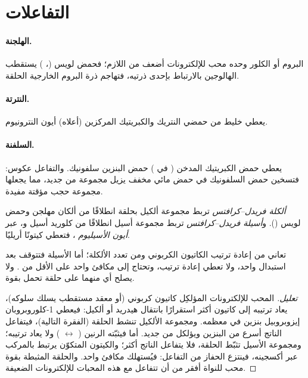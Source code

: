 \section{التفاعلات}

\paragraph{الهلجنة.} البروم أو الكلور وحده محب للإلكترونات أضعف من اللازم؛ فحمض لويس
(، ) يستقطب الهالوجين بالارتباط بإحدى ذرتيه، فتهاجم ذرة
البروم الخارجية الحلقة.

\paragraph{النترتة.} يعطي خليط من حمضي النتريك والكبريتيك المركزين (أعلاه)
أيون النترونيوم.

\paragraph{السلفنة.} يعطي حمض الكبريتيك المدخن ( في ) حمض البنزين سلفونيك.
والتفاعل عكوس: فتسخين حمض السلفونيك في حمض مائي مخفف يزيل
مجموعة  من جديد، مما يجعلها مجموعة حجب مؤقتة مفيدة.

\begin{definition}\label{def:b2:aromatic-substitution:friedel-crafts}
\emph{ألكلة فريدل--كرافتس} تربط مجموعة ألكيل
بحلقة  انطلاقًا من ألكان مهلجن وحمض لويس (). 
و\emph{أسيلة فريدل--كرافتس} تربط مجموعة أسيل
 انطلاقًا من كلوريد أسيل و، عبر \emph{أيون الأسيليوم}
، فتعطي كيتونًا أريليًا.
\end{definition}

\begin{proposition}\label{prop:b2:aromatic-substitution:friedel-crafts-limits}
تعاني  من إعادة ترتيب الكاتيون الكربوني ومن
تعدد الألكلة؛ أما الأسيلة فتتوقف بعد استبدال واحد، ولا تعطي إعادة ترتيب، وتحتاج إلى
مكافئ واحد على الأقل من . ولا يصلح أي منهما على حلقة تحمل  بقوة.
\end{proposition}

\begin{proof}[تعليل]
المحب للإلكترونات المؤلكِل كاتيون كربوني (أو معقد مستقطب يسلك سلوكه)،
يعاد ترتيبه إلى كاتيون أكثر استقرارًا بانتقال هيدريد أو ألكيل: فيعطي 1-كلوروبروبان
إيزوبروبيل بنزين في معظمه. ومجموعة الألكيل تنشط الحلقة (الفقرة التالية)، فيتفاعل الناتج
أسرع من البنزين ويؤلكل من جديد. أما  فيثبّته
الرنين ( $\leftrightarrow$ ) ولا يعاد ترتيبه؛ ومجموعة الأسيل
تثبّط الحلقة، فلا يتفاعل الناتج أكثر؛ والكيتون المتكوّن يرتبط
بالمركب  عبر أكسجينه، فينتزع الحفاز من التفاعل: فيُستهلك مكافئ
واحد. والحلقة المثبطة بقوة محب للنواة أفقر من أن تتفاعل مع هذه المحبات للإلكترونات الضعيفة.
\end{proof}

